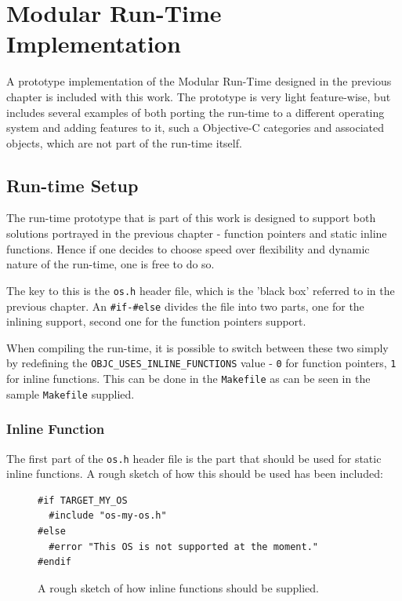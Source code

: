 \chapter{Modular Run-Time Implementation}

A prototype implementation of the Modular Run-Time designed in the previous chapter is included with this work. The prototype is very light feature-wise, but includes several examples of both porting the run-time to a different operating system and adding features to it, such a Objective-C categories and associated objects, which are not part of the run-time itself.

\section{Run-time Setup}

The run-time prototype that is part of this work is designed to support both solutions portrayed in the previous chapter - function pointers and static inline functions. Hence if one decides to choose speed over flexibility and dynamic nature of the run-time, one is free to do so.

The key to this is the \verb=os.h= header file, which is the 'black box' referred to in the previous chapter. An \verb=#if-#else= divides the file into two parts, one for the inlining support, second one for the function pointers support.

When compiling the run-time, it is possible to switch between these two simply by redefining the \verb=OBJC_USES_INLINE_FUNCTIONS= value - \verb=0= for function pointers, \verb=1= for inline functions. This can be done in the \verb=Makefile= as can be seen in the sample \verb=Makefile= supplied.

\subsection{Inline Function}

The first part of the \verb=os.h= header file is the part that should be used for static inline functions. A rough sketch of how this should be used has been included:

\begin{figure}[H]
\begin{verbatim}
#if TARGET_MY_OS
  #include "os-my-os.h"
#else
  #error "This OS is not supported at the moment."
#endif
\end{verbatim}
  \centering{}
  \caption{A rough sketch of how inline functions should be supplied.}
  \label{ref:inline_functions_supply}
\end{figure}

